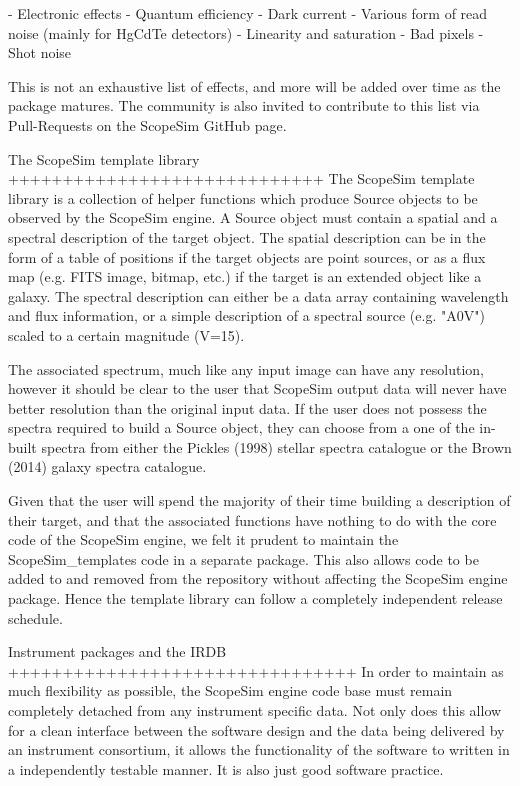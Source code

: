 - Electronic effects
    - Quantum efficiency
    - Dark current
    - Various form of read noise (mainly for HgCdTe detectors)
    - Linearity and saturation
    - Bad pixels
    - Shot noise

This is not an exhaustive list of effects, and more will be added over time as
the package matures. The community is also invited to contribute to this list
via Pull-Requests on the ScopeSim GitHub page.


The ScopeSim template library
+++++++++++++++++++++++++++++
The ScopeSim template library is a collection of helper functions which produce
Source objects to be observed by the ScopeSim engine. A Source object must
contain a spatial and a spectral description of the target object. The spatial
description can be in the form of a table of positions if the target objects are
point sources, or as a flux map (e.g. FITS image, bitmap, etc.) if the
target is an extended object like a galaxy. The spectral description can either
be a data array containing wavelength and flux information, or a simple
description of a spectral source (e.g. "A0V") scaled to a certain magnitude
(V=15).

The associated spectrum, much like any input image can have any resolution,
however it should be clear to the user that ScopeSim output data will never
have better resolution than the original input data. If the user does not
possess the spectra required to build a Source object, they can choose from a
one of the in-built spectra from either the Pickles (1998) stellar spectra
catalogue or the Brown (2014) galaxy spectra catalogue.

Given that the user will spend the majority of their time building a description
of their target, and that the associated functions have nothing to do with the
core code of the ScopeSim engine, we felt it prudent to maintain the
ScopeSim_templates code in a separate package. This also allows code to be added
to and removed from the repository without affecting the ScopeSim engine
package. Hence the template library can follow a completely independent release
schedule.


Instrument packages and the IRDB
++++++++++++++++++++++++++++++++
In order to maintain as much flexibility as possible, the ScopeSim engine
code base must remain completely detached from any instrument specific data.
Not only does this allow for a clean interface between the software design and
the data being delivered by an instrument consortium, it allows the
functionality of the software to written in a independently testable manner.
It is also just good software practice.

